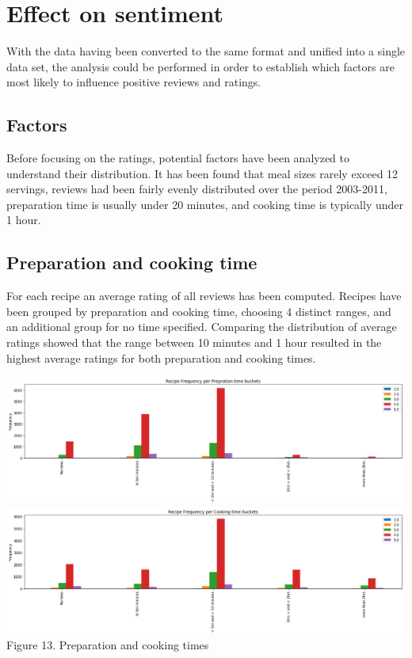 \documentclass[11pt]{article}
\begin{document}
\section{Effect on sentiment}

With the data having been converted to the same format and unified into a single data set, the analysis could be performed in order to establish which factors are most likely to influence positive reviews and ratings.

\subsection{Factors}

Before focusing on the ratings, potential factors have been analyzed to understand their distribution. It has been found that meal sizes rarely exceed 12 servings, reviews had been fairly evenly distributed over the period 2003-2011, preparation time is usually under 20 minutes, and cooking time is typically under 1 hour.

\subsection{Preparation and cooking time}

For each recipe an average rating of all reviews has been computed. Recipes have been grouped by preparation and cooking time, choosing 4 distinct ranges, and an additional group for no time specified. Comparing the distribution of average ratings showed that the range between 10 minutes and 1 hour resulted in the highest average ratings for both preparation and cooking times.

\vspace{5mm}
\begin{center}
\includegraphics[scale=0.16]{preptime-rating}
\includegraphics[scale=0.16]{cooktime-rating}
\label{time-rating} Figure 13. Preparation and cooking times
\end{center}
\vspace{5mm}
\end{document}
